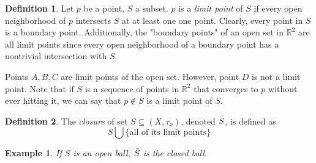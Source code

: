 \documentclass{article}
\newtheorem{example}{Example}[section]
\theoremstyle{remark}
\theoremstyle{definition}
\newtheorem{definition}{Definition}[section]
\begin{document}
\begin{definition}
Let $p$ be a point, $S$ a subset. $p$ is a \textit{limit point} of $S$ if every open neighborhood of $p$ intersects $S$ at at least one one point. Clearly, every point in $S$ is a boundary point. Additionally, the "boundary points" of an open set in $\mathbb{R}^2$ are all limit points since every open neighborhood of a boundary point has a nontrivial intersection with $S$. 

\begin{center}
\end{center}
Points $A, B, C$ are limit points of the open set. However, point $D$ is not a limit point. Note that if $S$ is a sequence of points in $\mathbb{R}^{2}$ that converges to $p$ without ever hitting it, we can say that $p \not\in S$ is a limit point of $S$. 
\begin{center}
\end{center}
\end{definition}

\begin{definition}
The \textit{closure} of set $S \subseteq (X, \tau_{x})$, denoted $\Bar{S}$, is defined as 
\[ S \bigcup \{\text{all of its limit points}\} \]
\end{definition}

\begin{example}
If $S$ is an open ball, $\Bar{S}$ is the closed ball. 
\end{example}
\end{document}
